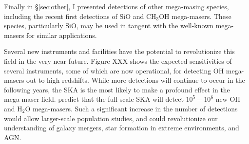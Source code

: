 Finally in \S\ref{sec:other}, I presented detections of other mega-masing species, including the recent first detections of SiO and CH$_3$OH mega-masers. These species, particularly SiO, may be used in tangent with the well-known mega-masers for similar applications.

Several new instruments and facilities have the potential to revolutionize this field in the very near future. Figure XXX shows the expected sensitivities of several instruments, some of which are now operational, for detecting OH mega-masers out to high redshifts. While more detections will continue to occur in the following years, the SKA is the most likely to make a profound effect in the mega-maser field. \citet{Morganti_2004} predict that the full-scale SKA will detect $10^5 - 10^6$ new OH and H$_2$O mega-masers. Such a significant increase in the number of detections would allow larger-scale population studies, and could revolutionize our understanding of galaxy mergers, star formation in extreme environments, and AGN.
